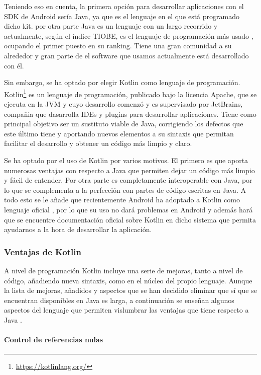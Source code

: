 Teniendo eso en cuenta, la primera opción para desarrollar aplicaciones con el SDK de Android sería Java, ya que es el lenguaje en el que está programado dicho kit. por otra parte Java es un lenguaje con un largo recorrido y actualmente, según el índice TIOBE, es el lenguaje de programación más usado \cite{tiobe}, ocupando el primer puesto en su ranking. Tiene una gran comunidad a su alrededor y gran parte de el software que usamos actualmente está desarrollado con él.

Sin embargo, se ha optado por elegir Kotlin como lenguaje de programación. Kotlin\footnote{\url{https://kotlinlang.org/}} es un lenguaje de programación, publicado bajo la licencia Apache, que se ejecuta en la JVM y cuyo desarrollo comenzó y es supervisado por JetBrains, compañia que dasarrolla IDEs y plugins para desarrollar aplicaciones. Tiene como principal objetivo ser un sustituto viable de Java, corrigiendo los defectos que este último tiene y aportando nuevos elementos a su sintaxis que permitan facilitar el desarrollo y obtener un código más limpio y claro.

Se ha optado por el uso de Kotlin por varios motivos. El primero es que aporta numerosas ventajas con respecto a Java que permiten dejar un código más limpio y fácil de entender. Por otra parte es completamente interoperable con Java, por lo que se complementa a la perfección con partes de código escritas en Java. A todo esto se le añade que recientemente Android ha adoptado a Kotlin como lenguaje oficial \cite{kotlin-android}, por lo que su uso no dará problemas en Android y además hará que se encuentre documentación oficial sobre Kotlin en dicho sistema que permita ayudarnos a la hora de desarrollar la aplicación.

\subsubsection{Ventajas de Kotlin}

A nivel de programación Kotlin incluye una serie de mejoras, tanto a nivel de código, añadiendo nueva sintaxis, como en el núcleo del propio lenguaje. Aunque la lista de mejoras, añadidos y aspectos que se han decidido eliminar que sí que se encuentran disponibles en Java es larga, a continuación se enseñan algunos aspectos del lenguaje que permiten vislumbrar las ventajas que tiene respecto a Java \cite{kotlin-vs-java}.

\paragraph{Control de referencias nulas}


